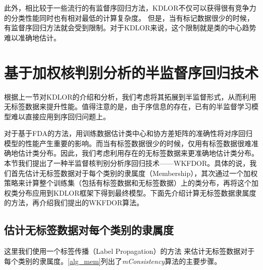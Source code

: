 此外，相比较于一些流行的有监督序回归方法，KDLOR不仅可以获得很有竞争力的分类性能同时也有相对最低的计算复杂度\citep{sun2010kernel}。
但是，当有标记数据很少的时候，有监督序回归方法就会受到限制。对于KDLOR来说，这个限制就是类的中心趋势难以准确地估计。

\section{基于加权核判别分析的半监督序回归技术}

根据上一节对KDLOR的介绍和分析，我们考虑将其拓展到半监督形式，从而利用无标签数据来提升性能。值得注意的是，由于序信息的存在，已有的半监督学习模型难以直接应用到序回归问题上。

对于基于FDA的方法，用训练数据估计类中心和协方差矩阵的准确性将对序回归模型的性能产生重要的影响。而当有标签数据很少的时候，仅用有标签数据很难准确地估计类分布。因此，我们考虑利用存在的无标签数据来更准确地估计类分布。本节我们提出了一种半监督核判别分析序回归技术——WKFDOR。具体的说，我们首先估计无标签数据对于每个类别的隶属度（Membership），其次通过一个加权策略来计算整个训练集（包括有标签数据和无标签数据）上的类分布，再将这个加权类分布应用到KDLOR框架下得到最终模型。下面先介绍计算无标签数据隶属度的方法，再介绍我们提出的WKFDOR算法。

\subsection{估计无标签数据对每个类别的隶属度}
这里我们使用一个标签传播（Label Propagation）的方法\citep{zhou2004learning}
来估计无标签数据对于每个类别的隶属度。\autoref{alg_mem}列出了\textit{mConsistency}算法的主要步骤。

